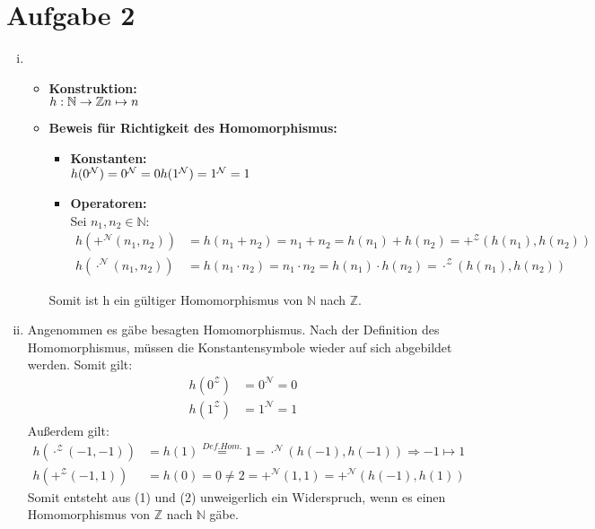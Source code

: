 \documentclass[a4paper,10pt]{article}
\newcommand{\N}{\mathbb{N}}
\newcommand{\Z}{\mathbb{Z}}
\begin{document}
\section*{Aufgabe 2}
\begin{enumerate}[(i)]
\item
	\begin{itemize}
		\item 	\textbf{Konstruktion: } \\
			\( h: \N \rightarrow \Z \\
			n \mapsto n \)
		\item 	\textbf{Beweis für Richtigkeit des Homomorphismus:} 
			\begin{itemize}
				\item 	\textbf{Konstanten:}\\
					\( h(0^{\mathcal{N}}) = 0^{\mathcal{N}} = 0 \\
					h(1^{\mathcal{N}}) = 1^{\mathcal{N}} = 1 \) 
				\item  	\textbf{Operatoren:} \\
					Sei $n_1,n_2 \in \N$:
					\begin{align*} h(+^{\mathcal{N}} (n_1,n_2)) &= h(n_1 + n_2) = n_1 + n_2 
					= h(n_1) + h(n_2) = +^{\mathcal{Z}} (h(n_1),h(n_2)) \\
					 h(\cdot^{\mathcal{N}} (n_1,n_2)) &= h(n_1 \cdot n_2) = n_1 \cdot n_2 
					= h(n_1) \cdot h(n_2) = \cdot^{\mathcal{Z}} (h(n_1),h(n_2)) \end{align*}
			\end{itemize}
	Somit ist h ein gültiger Homomorphismus von $\N$ nach $\Z$.
	\end{itemize}

\item
	Angenommen es gäbe besagten Homomorphismus. 
	Nach der Definition des Homomorphismus, müssen die Konstantensymbole wieder auf sich abgebildet werden.
	Somit gilt: 
	\begin{align*}
		h(0^{\mathcal{Z}}) &= 0^{\mathcal{N}} = 0  \\
		h(1^{\mathcal{Z}}) &= 1^{\mathcal{N}} = 1 
	\end{align*}
	Außerdem gilt: 
	\begin{align}
	 	h(\cdot^{\mathcal{Z}}(-1,-1)) &= h(1) \overset{Def. Hom.}{=} 1 = \cdot^{\mathcal{N}}(h(-1),h(-1)) \Rightarrow -1 \mapsto 1 \\
		h(+^{\mathcal{Z}}(-1,1)) &= h(0) = 0 \neq 2 = +^{\mathcal{N}}(1,1) = +^{\mathcal{N}}(h(-1),h(1)) 
	\end{align}
	Somit entsteht aus (1) und (2) unweigerlich ein Widerspruch, wenn es einen Homomorphismus von $\mathbb{Z}$ nach $\mathbb{N}$ gäbe.

	\end{enumerate}
\newpage
\end{document}
